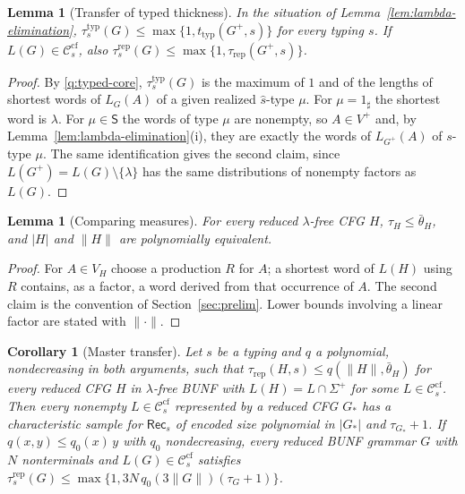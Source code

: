 \documentclass[11pt]{article}
\numberwithin{equation}{section}
\theoremstyle{plain}
\newtheorem{lemma}[theorem]{Lemma}
\newtheorem{corollary}[theorem]{Corollary}
\theoremstyle{definition}
\theoremstyle{remark}
\theoremstyle{plain}
\newcommand{\cf}{\mathrm{cf}}
\newcommand{\Ccf}[1]{\mathcal C_{#1}^{\cf}}
\newcommand{\Rec}{\mathsf{Rec}}
\newcommand{\ttyp}{t_{\mathrm{typ}}}
\newcommand{\trep}{\tau_{\mathrm{rep}}}
\begin{document}
\begin{lemma}[Transfer of typed thickness]
\label{lem:typed-transfer}
In the situation of Lemma~\ref{lem:lambda-elimination},
$\tau^{\mathrm{typ}}_s(G)\le\max\{1,\ttyp(G^+,s)\}$ for every typing $s$.  If
$L(G)\in\Ccf{s}$, also $\tau^{\mathrm{rep}}_s(G)\le\max\{1,\trep(G^+,s)\}$.
\end{lemma}

\begin{proof}
By \ref{q:typed-core}, $\tau^{\mathrm{typ}}_s(G)$ is the maximum of $1$ and of
the lengths of shortest words of $L_G(A)$ of a given realized
$\widehat s$-type $\mu$.  For $\mu=1_\sharp$ the shortest word is $\lambda$.  For
$\mu\in\mathsf S$ the words of type $\mu$ are nonempty, so $A\in V^+$ and, by
Lemma~\ref{lem:lambda-elimination}(i), they are exactly the words of
$L_{G^+}(A)$ of $s$-type $\mu$.  The same identification gives the second
claim, since $L(G^+)=L(G)\setminus\{\lambda\}$ has the same distributions of
nonempty factors as $L(G)$.
\end{proof}

\begin{lemma}[Comparing measures]
\label{lem:measures}
For every reduced $\lambda$-free CFG $H$, $\tau_H\le\bar\theta_H$, and $|H|$ and $\|H\|$
are polynomially equivalent.
\end{lemma}

\begin{proof}
For $A\in V_H$ choose a production $R$ for $A$; a shortest word of $L(H)$ using
$R$ contains, as a factor, a word derived from that occurrence of $A$.  The
second claim is the convention of Section~\ref{sec:prelim}.
Lower bounds involving a linear factor are stated with $\|\cdot\|$.
\end{proof}

\begin{corollary}[Master transfer]
\label{cor:master}
Let $s$ be a typing and $q$ a polynomial, nondecreasing in both arguments,
such that $\trep(H,s)\le q(\|H\|,\bar\theta_H)$ for every reduced CFG $H$ in
$\lambda$-free BUNF with $L(H)=L\cap\Sigma^+$ for some $L\in\Ccf{s}$.  Then every
nonempty $L\in\Ccf{s}$ represented by a reduced CFG $G_*$ has a
characteristic sample for $\Rec_s$ of encoded size polynomial in $|G_*|$ and
$\tau_{G_*}+1$.  If $q(x,y)\le q_0(x)\,y$ with $q_0$ nondecreasing, every reduced BUNF grammar $G$ with
$N$ nonterminals and $L(G)\in\Ccf{s}$ satisfies
$\tau^{\mathrm{rep}}_s(G)\le\max\{1,3N\,q_0(3\|G\|)(\tau_G+1)\}$.
\end{corollary}
\end{document}
